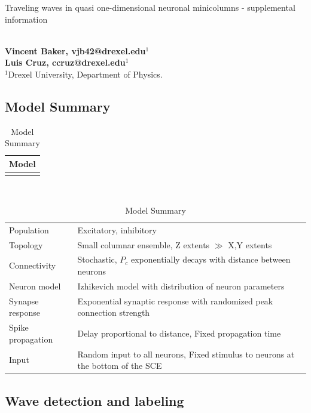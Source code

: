 \documentclass[12pt]{article}
\begin{document}
\vspace{20mm}

{\LARGE Traveling waves in quasi one-dimensional neuronal minicolumns - supplemental information}

\ \\
{\bf \large Vincent Baker, vjb42@drexel.edu$^{\displaystyle 1}$}\\
{\bf \large Luis Cruz, ccruz@drexel.edu$^{\displaystyle 1}$}\\
{$^{\displaystyle 1}$Drexel University, Department of Physics.}\\

\pagebreak

\subsection*{Model Summary}
\begin{table}[!htb]
 \caption{Model Summary}
 \label{tab:all_params}
 \centering
 \begin{tabular}{c}
  \textbf{Model} \\
  \hline \\
 \end{tabular} \\
 \begin{tabular}{l|l}
  Population & Excitatory, inhibitory \\
  Topology & Small columnar ensemble, Z extents $\gg$ X,Y extents \\
  Connectivity & Stochastic, $P_c$ exponentially decays with distance between neurons \\
  Neuron model & Izhikevich model with distribution of neuron parameters \\
  Synapse response & Exponential synaptic response with randomized peak connection strength  \\
  Spike propagation & Delay proportional to distance, Fixed propagation time \\
  Input & Random input to all neurons, Fixed stimulus to neurons at the bottom of the SCE \\
 \end{tabular}
\end{table}

\clearpage

\subsection*{Wave detection and labeling}
\end{document}
